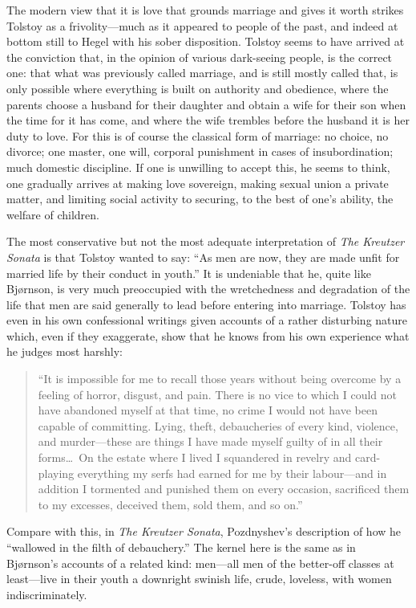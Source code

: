 \documentclass[12pt,a4paper]{article}
\begin{document}
The modern view that it is love that grounds marriage and gives it
worth strikes Tolstoy as a frivolity---much as it appeared to people
of the past, and indeed at bottom still to Hegel with his sober
disposition. Tolstoy seems to have arrived at the conviction that,
in the opinion of various dark-seeing people, is the correct one:
that what was previously called marriage, and is still mostly called
that, is only possible where everything is built on authority and
obedience, where the parents choose a husband for their daughter and
obtain a wife for their son when the time for it has come, and where
the wife trembles before the husband it is her duty to love. For this
is of course the classical form of marriage: no choice, no divorce;
one master, one will, corporal punishment in cases of insubordination;
much domestic discipline. If one is unwilling to accept this, he seems
to think, one gradually arrives at making love sovereign, making
sexual union a private matter, and limiting social activity to
securing, to the best of one's ability, the welfare of children.

The most conservative but not the most adequate interpretation of
\textit{The Kreutzer Sonata} is that Tolstoy wanted to say: ``As men
are now, they are made unfit for married life by their conduct in
youth.'' It is undeniable that he, quite like Bjørnson, is very much
preoccupied with the wretchedness and degradation of the life that men
are said generally to lead before entering into marriage. Tolstoy has
even in his own confessional writings given accounts of a rather
disturbing nature which, even if they exaggerate, show that he knows
from his own experience what he judges most harshly:

\begin{quote}
``It is impossible for me to recall those years without being overcome
by a feeling of horror, disgust, and pain. There is no vice to which
I could not have abandoned myself at that time, no crime I would not
have been capable of committing. Lying, theft, debaucheries of every
kind, violence, and murder---these are things I have made myself
guilty of in all their forms\ldots\ On the estate where I lived I
squandered in revelry and card-playing everything my serfs had earned
for me by their labour---and in addition I tormented and punished them
on every occasion, sacrificed them to my excesses, deceived them, sold
them, and so on.''
\end{quote}

Compare with this, in \textit{The Kreutzer Sonata}, Pozdnyshev's
description of how he ``wallowed in the filth of debauchery.'' The
kernel here is the same as in Bjørnson's accounts of a related kind:
men---all men of the better-off classes at least---live in their youth
a downright swinish life, crude, loveless, with women indiscriminately.
\end{document}
